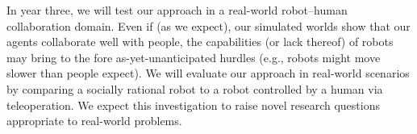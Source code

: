

In year three, we will test our approach in a real-world robot--human
collaboration domain.  Even if (as we expect), our simulated worlds
show that our agents collaborate well with people, the capabilities
(or lack thereof) of robots may bring to the fore as-yet-unanticipated
hurdles (e.g., robots might move slower than people expect).
We will evaluate our approach in real-world scenarios by comparing a
socially rational robot to a robot controlled by a human via
teleoperation.  We expect this investigation to raise novel research
questions appropriate to real-world problems.

%
% 
%
